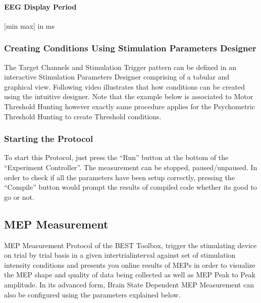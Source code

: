 \documentclass[letterpaper,10pt,english]{sphinxmanual}
\begin{document}
\paragraph{EEG Display Period}
\label{\detokenize{8_MEPDoseResponseCurve:eeg-display-period}}
\sphinxAtStartPar
{[}min max{]} in ms


\subsubsection{Creating Conditions Using Stimulation Parameters Designer}
\label{\detokenize{8_MEPDoseResponseCurve:creating-conditions-using-stimulation-parameters-designer}}
\sphinxAtStartPar
The Target Channels and Stimulation Trigger pattern can be defined in an interactive Stimulation Parameters Designer comprising of a tabular and graphical view. Following video illustrates that how conditions can be created using the intuitive designer. Note that the example below is associated to Motor Threshold Hunting however exactly same procedure applies for the Psychometric Threshold Hunting to create Threshold conditions.


\subsubsection{Starting the Protocol}
\label{\detokenize{8_MEPDoseResponseCurve:starting-the-protocol}}
\sphinxAtStartPar
To start this Protocol, just press the “Run” button at the bottom of the “Experiment Controller”. The measurement can be stopped, paused/unpaused. In order to check if all the parameters have been setup correctly, pressing the “Compile” button would prompt the results of compiled code whether its good to go or not.


\subsection{MEP Measurement}
\label{\detokenize{9_MEPMeasurement:mep-measurement}}\label{\detokenize{9_MEPMeasurement::doc}}
\sphinxAtStartPar
MEP Measurement Protocol of the BEST Toolbox, trigger the stimulating device on trial by trial basis in a given inter\sphinxhyphen{}trial\sphinxhyphen{}interval against set of stimulation intensity conditions and presents you online results of MEPs in order to visualize the MEP shape and quality of data being collected as well as MEP Peak to Peak amplitude. In its advanced form, Brain State\sphinxhyphen{} Dependent MEP Measurement can also be configured using the parameters explained below.
\end{document}
